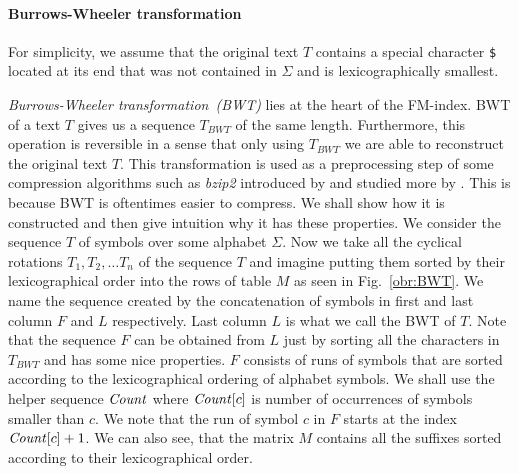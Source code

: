 \paragraph{Burrows-Wheeler transformation}

For simplicity, we assume that the original text $T$ contains a special character {\tt \$}
located at its end that was not contained in $\Sigma$ and is lexicographically smallest.

\textit{Burrows-Wheeler transformation~(BWT)} lies at the heart of the FM-index.
BWT of a text $T$ gives us a sequence $\mathit{T_{BWT}}$ of the same length. Furthermore, this
operation is reversible in a sense that only using $\mathit{T_{BWT}}$ we are able to reconstruct
the original text $T$. This transformation is used as a preprocessing step of some compression
algorithms such as \textit{bzip2} introduced by \cite{seward1996bzip2} and studied more by
\cite{manzini2001analysis}. This is because
BWT is oftentimes easier to compress. We shall show how it is constructed and then give 
intuition why it has these properties. We consider the sequence $T$ of symbols over some
alphabet $\Sigma$. Now we take all the cyclical rotations $T_1, T_2, \ldots T_n$ of
the sequence $T$ and imagine putting them sorted by their lexicographical order into the
rows of table $M$ as seen in Fig.~\ref{obr:BWT}. We name the sequence created by the
concatenation of symbols in first and last column $F$ and $L$ respectively. Last column $L$
is what we call the BWT of $T$. Note that the sequence $F$ can be obtained from $L$ just by
sorting all the characters in $\mathit{T_{BWT}}$ and has some nice properties. $F$ consists of
runs of symbols that are sorted according to the lexicographical ordering of alphabet symbols.
We shall use the helper sequence $\mathit{Count}$ where $\mathit{Count}[c]$ is number of
occurrences of symbols smaller than $c$. We note that the run of symbol $c$ in $F$ starts at
the index $\mathit{Count}[c]+1$. We can also see, that the matrix $M$ contains all the suffixes
sorted according to their lexicographical order.

